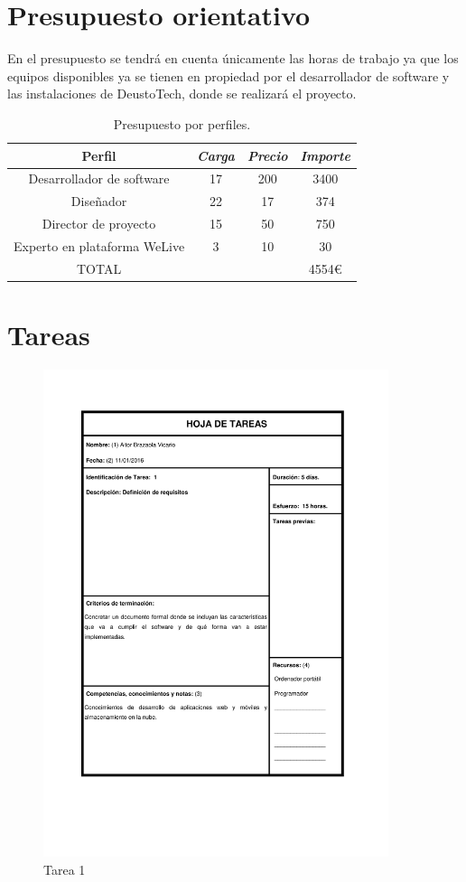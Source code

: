\documentclass{DeustoFDP}
\begin{document}
\section{Presupuesto orientativo}
En el presupuesto se tendrá en cuenta únicamente las horas de trabajo ya que los equipos disponibles ya se tienen en propiedad por el desarrollador de software y las instalaciones de DeustoTech, donde se realizará el proyecto.
\begin{table}
  
  \caption{Presupuesto por perfiles.}\label{tab:presupuestoperfiles}
  \begin{tabular}{cccc}
    \toprule
      \textbf{Perfil} & \emph{Carga} & \emph{Precio} & \emph{Importe}\\
    \midrule
      Desarrollador de software  & 17     & 200 & 3400 \\
      Diseñador   & 22     & 17 & 374 \\
      Director de proyecto & 15     & 50  & 750 \\
      Experto en plataforma WeLive & 3     & 10 & 30 \\
      TOTAL & & & 4554€\\
    \bottomrule
  \end{tabular}
\end{table}
\newpage
\section{Tareas}
\begin{figure}[H]
    \centering
    \includegraphics[width=0.9\textwidth]{fig/Tareas/1}
    \caption{Tarea 1}
    \label{fig:t1}
\end{figure}
\end{document}
